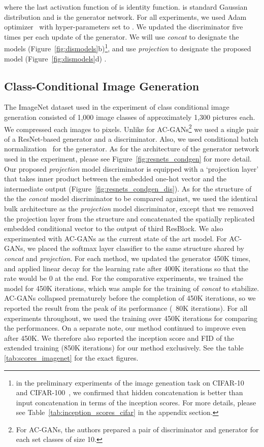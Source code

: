 \documentclass{article}
\begin{document}
where the last activation function  of  is identity function.   is standard Gaussian distribution and  is the generator network.
For all experiments, we used Adam optimizer~\cite[]{kingma2014adam} with hyper-parameters set to . 
We updated the discriminator five times per each update of the generator. 
We will use \textit{concat} to designate the models (Figure~\ref{fig:dismodels}b)\footnote{in the preliminary experiments of the image geneation task on CIFAR-10~\cite[]{torralba200880} and CIFAR-100~\cite[]{torralba200880}, we confirmed that hidden concatenation is better than input concatenation in terms of the inception scores. For more details, please see Table~\ref{tab:inception_scores_cifar} in the appendix section.}, and use \textit{projection} to designate the proposed model (Figure~\ref{fig:dismodels}d) . 

\subsection{Class-Conditional Image Generation}
The ImageNet dataset used in the experiment of class conditional image generation consisted of 1,000 image classes of approximately 1,300 pictures each.  
We compressed each images to  pixels.
Unlike for AC-GANs\footnote{For AC-GANs, the authors prepared a pair of discriminator and generator for each set classes of size 10.} we used a single pair of a ResNet-based generator and a discriminator.
Also, we used conditional batch normalization~\cite[]{dumoulin2016learned, de2017modulating} for the generator.
As for the architecture of the generator network used in the experiment, please see Figure~\ref{fig:resnets_condgen} for more detail.
Our proposed \textit{projection} model discriminator is equipped with a `projection layer' that takes inner product between the embedded one-hot vector  and the intermediate output (Figure~\ref{fig:resnets_condgen_dis}).
As for the structure of the the \textit{concat} model discriminator to be compared against, we used the identical bulk architecture as the \textit{projection} model discriminator, except that we removed the projection layer from the structure and concatenated the spatially replicated embedded conditional vector  to the output of third ResBlock.
We also experimented with AC-GANs as the current state of the art model. 
For AC-GANs, we placed the softmax layer classifier to the same structure shared by \textit{concat} and \textit{projection}. 
For each method, we updated the generator 450K times, and applied linear decay for the learning rate after 400K iterations so that the rate would be 0 at the end.
For the comparative experiments, we trained the model for 450K iterations, which was ample for the training of \textit{concat} to stabilize. 
AC-GANs collapsed prematurely before the completion of 450K iterations, so we reported the result from the peak of its performance (~80K iterations).  
For all experiments throughout, we used the training over 450K iterations for comparing the performances. 
On a separate note, our method continued to improve even after 450K. We therefore also reported the inception score and FID of the extended training (850K iterations) for our method exclusively.
See the table \ref{tab:scores_imagenet} for the exact figures.
\end{document}
